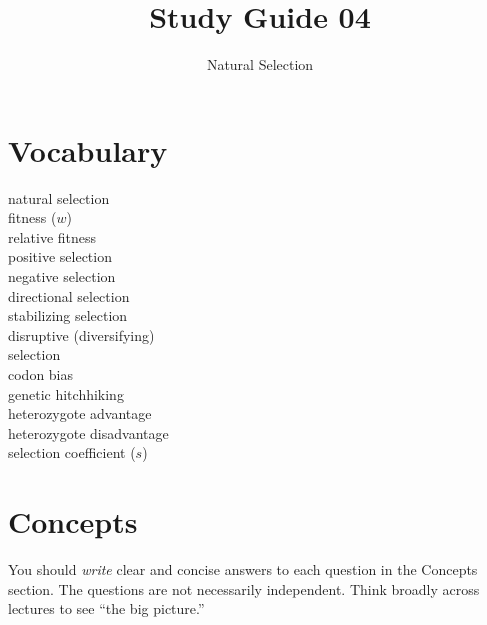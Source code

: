 \documentclass[letterpaper]{tufte-handout}
\title{Study Guide 04\hfill}
\author{Natural Selection}
\date{} %
\begin{document}
\maketitle	%


\section{Vocabulary} 
\vspace{-1\baselineskip}
\begin{multicols}{2}
natural selection\\
fitness ($w$)\\
relative fitness\\
positive selection\\
negative selection\\
directional selection\\
stabilizing selection\\
disruptive (diversifying)\\\hspace{1em}selection\\
codon bias\\
genetic hitchhiking\\
heterozygote advantage\\
heterozygote disadvantage\\
selection coefficient ($s$)
\end{multicols}

\section{Concepts}

You should \emph{write} clear and concise answers to each question in the Concepts section.  The questions are not necessarily independent.  Think broadly across lectures to see ``the big picture.'' 
\end{document}

